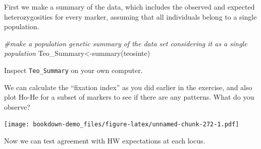 \documentclass[
]{book}
\newenvironment{Shaded}{\begin{snugshade}}{\end{snugshade}}
\newcommand{\AttributeTok}[1]{\textcolor[rgb]{0.77,0.63,0.00}{#1}}
\newcommand{\CommentTok}[1]{\textcolor[rgb]{0.56,0.35,0.01}{\textit{#1}}}
\newcommand{\DecValTok}[1]{\textcolor[rgb]{0.00,0.00,0.81}{#1}}
\newcommand{\FunctionTok}[1]{\textcolor[rgb]{0.00,0.00,0.00}{#1}}
\newcommand{\NormalTok}[1]{#1}
\newcommand{\OtherTok}[1]{\textcolor[rgb]{0.56,0.35,0.01}{#1}}
\newcommand{\SpecialCharTok}[1]{\textcolor[rgb]{0.00,0.00,0.00}{#1}}
\newcommand{\StringTok}[1]{\textcolor[rgb]{0.31,0.60,0.02}{#1}}
\begin{document}
First we make a summary of the data, which includes the observed and expected heterozygosities for every marker, assuming that all individuals belong to a single population.

\begin{Shaded}
\begin{Highlighting}[]
\CommentTok{\#make a population genetic summary of the data set considering it as a single population}
\NormalTok{Teo\_Summary}\OtherTok{\textless{}{-}}\FunctionTok{summary}\NormalTok{(teosinte)}
\end{Highlighting}
\end{Shaded}

Inspect \texttt{Teo\_Summary} on your own computer.

We can calculate the ``fixation index'' as you did earlier in the exercise, and also plot Ho-He for a subset of markers to see if there are any patterns. What do you observe?

\begin{Shaded}
\end{Shaded}

\texttt{[image: bookdown-demo\_files/figure-latex/unnamed-chunk-272-1.pdf]}

\begin{Shaded}
\end{Shaded}

Now we can test agreement with HW expectations at each locus.
\end{document}
